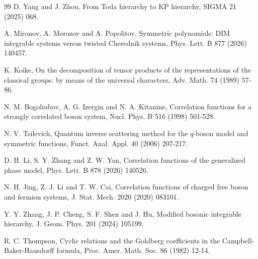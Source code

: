 \documentclass[11pt,reqno]{amsart}
\numberwithin{equation}{section}
\begin{document}
\begin{thebibliography}{99}
D. Yang and J. Zhou, From Toda hierarchy to KP hierarchy, SIGMA 21 (2025) 068.

A. Mironov, A. Morozov and A. Popolitov, Symmetric polynomials: DIM integrable systems versus twisted Cherednik systems, Phys. Lett. B 877 (2026) 140457.


K. Koike, On the decomposition of tensor products of the representations of the classical groups: by means of the universal characters, Adv. Math. 74 (1989) 57-86.

N. M. Bogoliubov, A. G. Izergin and N. A. Kitanine, Correlation functions for a strongly correlated boson system, Nucl. Phys. B 516 (1998) 501-528.


N. V. Tsilevich, Quantum inverse scattering method for the $q$-boson model and symmetric functions, Funct. Anal. Appl. 40 (2006) 207-217.

D. H. Li, S. Y. Zhang and Z. W. Yan, Correlation functions of the generalized phase model, Phys. Lett. B 878 (2026) 140526.


N. H. Jing, Z. J. Li and T. W. Cai, Correlation functions of charged free boson and fermion systems, J. Stat. Mech. 2020 (2020) 083101.


Y. Y. Zhang, J. P. Cheng, S. F. Shen and J. Hu, Modified bosonic integrable hierarchy, J. Geom. Phys. 201 (2024) 105199.


R. C. Thompson, Cyclic relations and the Goldberg coefficients in the Campbell-Baker-Hausdorff formula, Proc. Amer. Math. Soc. 86 (1982) 12-14.


\end{thebibliography}
\end{document}
